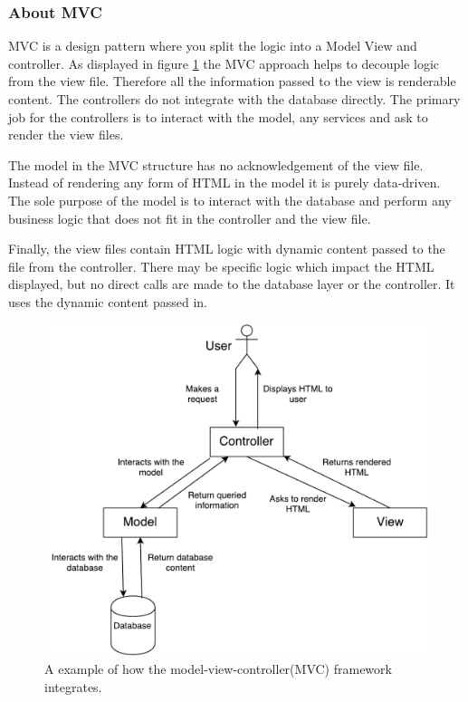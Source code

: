 \subsubsection{About MVC}
MVC is a design pattern where you split the logic into a Model View and controller. As displayed in figure \ref{fig:mvc} the MVC approach helps to decouple logic from the view file. Therefore all the information passed to the view is renderable content. The controllers do not integrate with the database directly. The primary job for the controllers is to interact with the model, any services and ask to render the view files.

The model in the MVC structure has no acknowledgement of the view file. Instead of rendering any form of HTML in the model it is purely data-driven. The sole purpose of the model is to interact with the database and perform any business logic that does not fit in the controller and the view file.

Finally, the view files contain HTML logic with dynamic content passed to the file from the controller. There may be specific logic which impact the HTML displayed, but no direct calls are made to the database layer or the controller. It uses the dynamic content passed in.
\begin{figure}[h]
  \centering
  \includegraphics[scale=0.5]{images/MVC}
  \caption{A example of how the model-view-controller(MVC) framework integrates.}
  \label{fig:mvc}
\end{figure}

